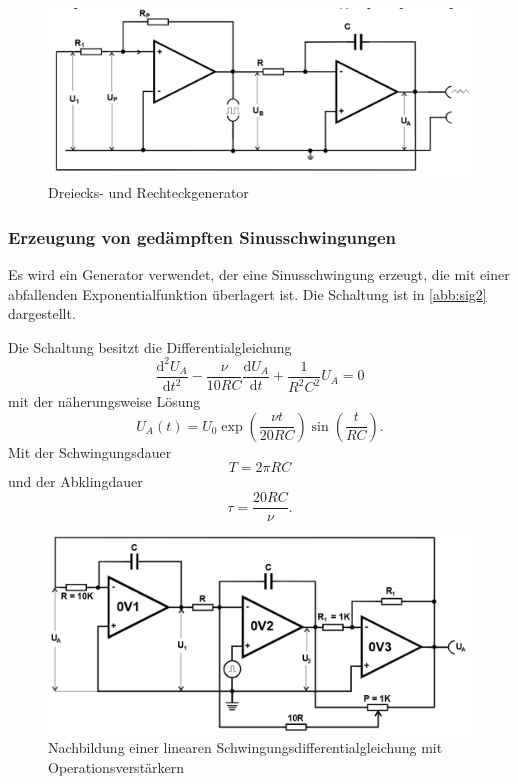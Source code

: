 \begin{figure}[h!]
 	\centering
 	\includegraphics[width=\textwidth]{img/gen.png}
 	\caption{Dreiecks- und Rechteckgenerator \cite{FP}}
 	\label{abb:sig}
\end{figure}

\subsubsection{Erzeugung von ged{\"a}mpften Sinusschwingungen}
Es wird ein Generator verwendet, der eine Sinusschwingung erzeugt, die mit einer abfallenden Exponentialfunktion überlagert ist. Die Schaltung ist in \autoref{abb:sig2} dargestellt.

\noindent Die Schaltung besitzt die Differentialgleichung
\begin{equation}
\frac{\text{d}^2 U_A}{\text{d}t^2} - \frac{\nu}{10RC} \frac{\text{d} U_A}{\text{d}t} + \frac{1}{R^2 C^2} U_A = 0
\end{equation}
mit der näherungsweise Lösung
\begin{equation}
U_A(t) = U_0 \exp\left(\frac{\nu t}{20 RC}\right) \sin\left(\frac{t}{RC}\right) .
\end{equation}
Mit der Schwingungsdauer
\begin{equation}
T = 2\pi RC
\end{equation}
und der Abklingdauer
\begin{equation}
\tau = \frac{20 RC}{\nu} .
\end{equation}

\begin{figure}[h!]
 	\centering
 	\includegraphics[width=\textwidth]{img/sin.png}
 	\caption{Nachbildung einer linearen Schwingungsdifferentialgleichung mit Operationsverstärkern \cite{FP}}
 	\label{abb:sig2}
\end{figure}
